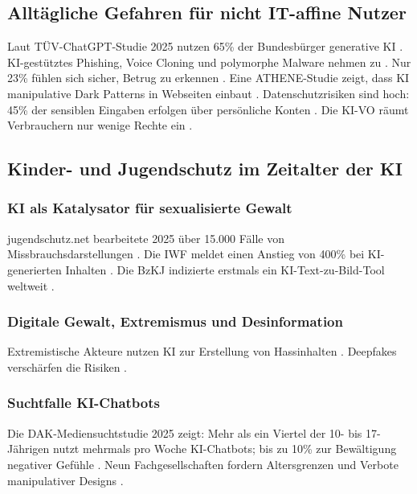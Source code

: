 \documentclass[12pt,a4paper]{article}
\begin{document}
	\subsection{Alltägliche Gefahren für nicht IT-affine Nutzer}
	
	Laut TÜV-ChatGPT-Studie 2025 nutzen 65\% der Bundesbürger generative KI \cite{TUEV2025}. KI-gestütztes Phishing, Voice Cloning und polymorphe Malware nehmen zu \cite{SecurityInsider2025a, Watchguard2025, ConnectProfessional2025}. Nur 23\% fühlen sich sicher, Betrug zu erkennen \cite{SecurityInsider2025b}. Eine ATHENE-Studie zeigt, dass KI manipulative Dark Patterns in Webseiten einbaut \cite{ATHENE2025}. Datenschutzrisiken sind hoch: 45\% der sensiblen Eingaben erfolgen über persönliche Konten \cite{Itwelt2025}. Die KI-VO räumt Verbrauchern nur wenige Rechte ein \cite{VZBV2025}.
	
	\subsection{Kinder- und Jugendschutz im Zeitalter der KI}
	
	\subsubsection{KI als Katalysator für sexualisierte Gewalt}
	
	jugendschutz.net bearbeitete 2025 über 15.000 Fälle von Missbrauchsdarstellungen \cite{jugendschutz2025}. Die IWF meldet einen Anstieg von 400\% bei KI-generierten Inhalten \cite{IWF2025}. Die BzKJ indizierte erstmals ein KI-Text-zu-Bild-Tool weltweit \cite{BzKJ2025}.
	
	\subsubsection{Digitale Gewalt, Extremismus und Desinformation}
	
	Extremistische Akteure nutzen KI zur Erstellung von Hassinhalten \cite{jugendschutz2025}. Deepfakes verschärfen die Risiken \cite{BayJumko2025}.
	
	\subsubsection{Suchtfalle KI-Chatbots}
	
	Die DAK-Mediensuchtstudie 2025 zeigt: Mehr als ein Viertel der 10- bis 17-Jährigen nutzt mehrmals pro Woche KI-Chatbots; bis zu 10\% zur Bewältigung negativer Gefühle \cite{DAK2025}. Neun Fachgesellschaften fordern Altersgrenzen und Verbote manipulativer Designs \cite{Fachgesellschaften2025}.
	
\end{document}
